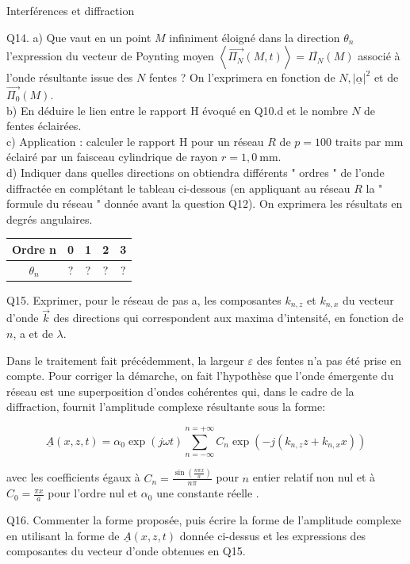\begin{exo}[PC][1][devoir]{Interférences et diffraction}
{Q14. a) Que vaut en un point $M$ infiniment éloigné dans la direction $\theta_{n}$ l'expression du vecteur de Poynting moyen $\left\langle\overrightarrow{\Pi_{N}}(M, t)\right\rangle=\overline{\Pi_{N}}(M)$ associé à l'onde résultante issue des $N$ fentes ? On l'exprimera en fonction de $N,|\underline{\alpha}|^{2}$ et de $\overrightarrow{\Pi_{0}}(M)$.\\
b) En déduire le lien entre le rapport H évoqué en Q10.d et le nombre $N$ de fentes éclairées.\\
c) Application : calculer le rapport H pour un réseau $R$ de $p=100$ traits par mm éclairé par un faisceau cylindrique de rayon $r=1,0 \mathrm{~mm}$.\\
d) Indiquer dans quelles directions on obtiendra différents " ordres " de l'onde diffractée en complétant le tableau ci-dessous (en appliquant au réseau $R$ la " formule du réseau " donnée avant la question Q12). On exprimera les résultats en degrés angulaires.

\begin{tabular}{|c|c|c|c|c|}
\hline
Ordre n & 0 & 1 & 2 & 3 \\
\hline
$\theta_{n}$ & $?$ & $?$ & $?$ & $?$ \\
\hline
\end{tabular}

Q15. Exprimer, pour le réseau de pas a, les composantes $k_{n, z}$ et $k_{n, x}$ du vecteur d'onde $\vec{k}$ des directions qui correspondent aux maxima d'intensité, en fonction de $n$, a et de $\lambda$.

Dans le traitement fait précédemment, la largeur $\varepsilon$ des fentes n'a pas été prise en compte. Pour corriger la démarche, on fait l'hypothèse que l'onde émergente du réseau est une superposition d'ondes cohérentes qui, dans le cadre de la diffraction, fournit l'amplitude complexe résultante sous la forme:

$$
\underline{A}(x, z, t)=\alpha_{0} \exp (j \omega t) \sum_{n=-\infty}^{n=+\infty} C_{n} \exp \left(-j\left(k_{n, z} z+k_{n, x} x\right)\right)
$$

avec les coefficients égaux à $C_{n}=\frac{\sin \left(\frac{n \pi x}{a}\right)}{n \pi}$ pour $n$ entier relatif non nul et à $C_{0}=\frac{\pi x}{a}$ pour l'ordre nul et $\alpha_{0}$ une constante réelle .

Q16. Commenter la forme proposée, puis écrire la forme de l'amplitude complexe en utilisant la forme de $\underline{A}(x, z, t)$ donnée ci-dessus et les expressions des composantes du vecteur d'onde obtenues en Q15.

}
\end{exo}

